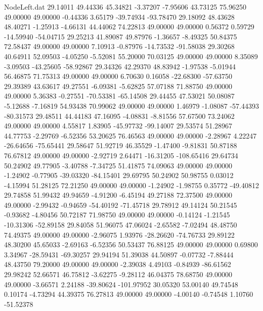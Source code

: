 \begin{filecontents}{NodeLeft.dat}
  29.14011   49.44336   45.34821    -3.37207   -7.95606   43.73125   75.96250   49.00000   49.00000   -0.44336    3.65179  -39.74934  -93.78470
  29.18092   48.43628   48.40271    -1.25913   -4.66131   44.44062   74.22813   49.00000   49.00000    0.56372    0.59729  -14.59940  -54.04715
  29.25213   41.89087   49.87976    -1.36657   -8.49325   50.84375   72.58437   49.00000   49.00000    7.10913   -0.87976  -14.73532  -91.58038
  29.30268   40.64911   52.09503    -4.05250   -5.52081   55.20000   70.03125   49.00000   49.00000    8.35089   -3.09503  -43.25605  -58.92867
  29.34326   42.29370   48.83942    -1.97538   -5.01944   56.46875   71.75313   49.00000   49.00000    6.70630    0.16058  -22.68300  -57.63750
  29.39389   43.63617   49.27551    -6.09381   -5.62825   57.07188   71.88750   49.00000   49.00000    5.36383   -0.27551  -70.53381  -65.14508
  29.44455   47.53021   50.08087    -5.12688   -7.16819   54.93438   70.99062   49.00000   49.00000    1.46979   -1.08087  -57.44393  -80.31573
  29.48511   44.44183   47.16095    -4.08831   -8.81556   57.67500   73.24062   49.00000   49.00000    4.55817    1.83905  -45.97732  -99.14007
  29.53574   51.28967   44.77753    -2.29769   -6.52356   53.20625   76.46563   49.00000   49.00000   -2.28967    4.22247  -26.64656  -75.65441
  29.58647   51.92719   46.35529    -1.47400   -9.81831   50.87188   76.67812   49.00000   49.00000   -2.92719    2.64471  -16.31205 -108.65416
  29.64734   50.24902   49.77905    -3.40788   -7.34725   51.41875   74.09063   49.00000   49.00000   -1.24902   -0.77905  -39.03320  -84.15401
  29.69795   50.24902   50.98755     0.03012   -4.15994   51.28125   72.21250   49.00000   49.00000   -1.24902   -1.98755    0.35772  -49.40812
  29.74858   51.99432   49.94659    -4.91200   -6.45194   49.27188   72.37500   49.00000   49.00000   -2.99432   -0.94659  -54.40192  -71.45718
  29.78912   49.14124   50.21545    -0.93682   -4.80456   50.72187   71.98750   49.00000   49.00000   -0.14124   -1.21545  -10.31306  -52.89158
  29.84058   51.96075   47.06024    -2.65582   -7.02494   48.48750   74.49375   49.00000   49.00000   -2.96075    1.93976  -28.26620  -74.76733
  29.89122   48.30200   45.65033    -2.69163   -6.52356   50.53437   76.88125   49.00000   49.00000    0.69800    3.34967  -28.59431  -69.30257
  29.94194   51.39038   44.50897    -0.07732   -7.88444   48.43750   79.20000   49.00000   49.00000   -2.39038    4.49103   -0.84939  -86.61562
  29.98242   52.66571   46.75812    -3.62275   -9.28112   46.04375   78.68750   49.00000   49.00000   -3.66571    2.24188  -39.80624 -101.97952
  30.05320   53.00140   49.74548     0.10174   -4.73294   44.39375   76.27813   49.00000   49.00000   -4.00140   -0.74548    1.10760  -51.52378

\end{filecontents}
